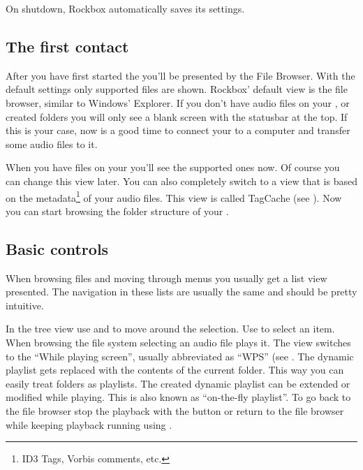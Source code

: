 \label{ref:Safeshutdown}On shutdown, Rockbox automatically saves its settings.
\subsection{The first contact}

After you have  first started the \dap{} you'll be presented by the File
Browser. With the default settings only supported files are shown. Rockbox'
default view is the file browser, similar to Windows' Explorer. If you don't
have audio files on your \dap{}, or created folders you will only see a blank
screen with the statusbar at the top. If this is your case, now is a good time
to connect your \dap{} to a computer and transfer some audio files to it.

When you have files on your \dap{} you'll see the supported ones now. Of
course you can change this view later. You can also completely switch to
a view that is based on the metadata\footnote{ID3 Tags, Vorbis comments, etc.}
of your audio files. This view is called TagCache (see
). Now you can start browsing the folder structure of
your \dap{}.

\subsection{Basic controls}
When browsing files and moving through menus you usually get a list view
presented. The navigation in these lists are usually the same and should be
pretty intuitive. 

In the tree view use \ActionStdNext{} and \ActionStdPrev{} to move around
the selection. Use \ActionStdOk{} to select an item. When browsing the file
system selecting an audio file plays it. The view switches to the ``While
playing screen'', usually abbreviated as ``WPS'' (see . The
dynamic playlist gets replaced with the contents of the current folder. This
way you can easily treat folders as playlists. The created dynamic playlist can
be extended or modified while playing. This is also known as
``on-the-fly playlist''.
To go back to the file browser stop the playback with the \ActionWpsStop{}
button or return to the file browser while keeping playback running using
\ActionWpsBrowse{}. 


